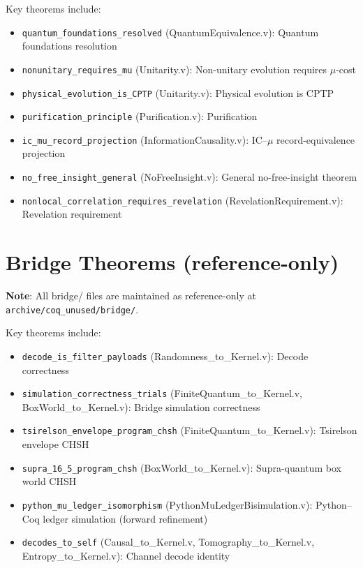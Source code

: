Key theorems include:
\begin{itemize}
    \item \texttt{quantum\_foundations\_resolved} (QuantumEquivalence.v): Quantum foundations resolution
    \item \texttt{nonunitary\_requires\_mu} (Unitarity.v): Non-unitary evolution requires $\mu$-cost
    \item \texttt{physical\_evolution\_is\_CPTP} (Unitarity.v): Physical evolution is CPTP
    \item \texttt{purification\_principle} (Purification.v): Purification
    \item \texttt{ic\_mu\_record\_projection} (InformationCausality.v): IC--$\mu$ record-equivalence projection
    \item \texttt{no\_free\_insight\_general} (NoFreeInsight.v): General no-free-insight theorem
    \item \texttt{nonlocal\_correlation\_requires\_revelation} (RevelationRequirement.v): Revelation requirement
\end{itemize}

\section{Bridge Theorems (reference-only)}

\textbf{Note}: All bridge/ files are maintained as reference-only at \texttt{archive/coq\_unused/bridge/}.

Key theorems include:
\begin{itemize}
    \item \texttt{decode\_is\_filter\_payloads} (Randomness\_to\_Kernel.v): Decode correctness
    \item \texttt{simulation\_correctness\_trials} (FiniteQuantum\_to\_Kernel.v, BoxWorld\_to\_Kernel.v): Bridge simulation correctness
    \item \texttt{tsirelson\_envelope\_program\_chsh} (FiniteQuantum\_to\_Kernel.v): Tsirelson envelope CHSH
    \item \texttt{supra\_16\_5\_program\_chsh} (BoxWorld\_to\_Kernel.v): Supra-quantum box world CHSH
    \item \texttt{python\_mu\_ledger\_isomorphism} (PythonMuLedgerBisimulation.v): Python--Coq ledger simulation (forward refinement)
    \item \texttt{decodes\_to\_self} (Causal\_to\_Kernel.v, Tomography\_to\_Kernel.v, Entropy\_to\_Kernel.v): Channel decode identity
\end{itemize}

